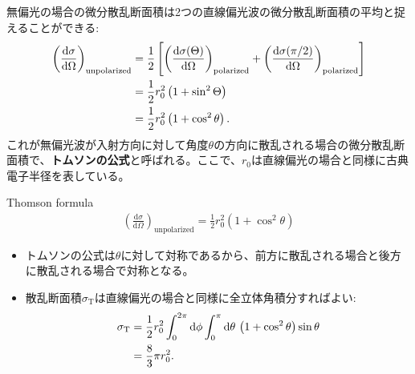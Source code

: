 \documentclass[a4paper,papersize,uplatex,dvipdfmx,10pt]{jsarticle}
\begin{document}
\begin{screen}
  無偏光の場合の微分散乱断面積は2つの直線偏光波の微分散乱断面積の平均と捉えることができる:
  \begin{align}
    \left( \frac{\mathrm{d}\sigma}{\mathrm{d}\Omega} \right)_{\mathrm{unpolarized}} &=
    \frac{1}{2}\left[ \left( \frac{\mathrm{d}\sigma(\Theta)}{\mathrm{d}\Omega} \right)_{\mathrm{polarized}} + \left( \frac{\mathrm{d}\sigma(\pi / 2)}{\mathrm{d}\Omega} \right)_{\mathrm{polarized}} \right]\notag\\
    &= \frac{1}{2}r_{0}^{2}\left( 1+\sin^{2}\Theta \right)\notag\\
    &= \frac{1}{2}r_{0}^{2}\left( 1+\cos^{2}\theta \right).
  \end{align}
  これが無偏光波が入射方向に対して角度$\theta$の方向に散乱される場合の微分散乱断面積で、\textbf{トムソンの公式}と呼ばれる。ここで、$r_{0}$は直線偏光の場合と同様に古典電子半径を表している。
  \begin{itembox}[l]{Thomson formula}
    \begin{align*}
      \left( \frac{\mathrm{d}\sigma}{\mathrm{d}\Omega} \right)_{\mathrm{unpolarized}} = \frac{1}{2}r_{0}^{2}\left( 1+\cos^{2}\theta \right)
    \end{align*}
  \end{itembox}
  \begin{itemize}
    \item トムソンの公式は$\theta$に対して対称であるから、前方に散乱される場合と後方に散乱される場合で対称となる。
    \item 散乱断面積$\sigma_{\mathrm{T}}$は直線偏光の場合と同様に全立体角積分すればよい:
    \begin{align}
      \sigma_{\mathrm{T}} &= \frac{1}{2}r_{0}^{2} \int^{2\pi}_{0}\mathrm{d}\phi \int^{\pi}_{0}\mathrm{d}\theta\, \left( 1+\cos^{2}\theta \right) \sin\theta\notag\\
      &= \frac{8}{3}\pi r_{0}^{2}.\label{eq:sanran_unpol}
    \end{align}
  \end{itemize}
\end{screen}
\end{document}
